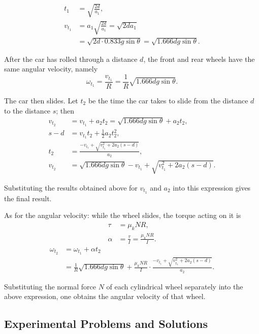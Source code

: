 \begin{align*}
t_1 &= \sqrt{\frac{2d}{a_1}},\\
v_{t_1} &= a_1\sqrt{\frac{2d}{a_1}} = \sqrt{2da_1}\\
&= \sqrt{2d\cdot 0.833g\sin\theta} = \sqrt{1.666dg\sin\theta}. \tag{28}
\end{align*}

After the car has rolled through a distance $d$, the front and rear wheels have the same angular velocity, namely
\begin{equation}
\omega_{t_1} = \frac{v_{t_1}}{R} = \frac{1}{R}\sqrt{1.666dg\sin\theta}. \tag{29}
\end{equation}

The car then slides. Let $t_2$ be the time the car takes to slide from the distance $d$ to the distance $s$; then
\begin{align*}
v_{t_2} &= v_{t_1} + a_2t_2 = \sqrt{1.666dg\sin\theta} + a_2t_2,\\
s - d &= v_{t_1}t_2 + \frac{1}{2}a_2t_2^2,\\
t_2 &= \frac{-v_{t_1} + \sqrt{v_{t_1}^2 + 2a_2(s-d)}}{a_2},\\
v_{t_2} &= \sqrt{1.666dg\sin\theta} - v_{t_1} + \sqrt{v_{t_1}^2 + 2a_2(s-d)}. \tag{30}
\end{align*}

Substituting the results obtained above for $v_{t_1}$ and $a_2$ into this expression gives the final result.

As for the angular velocity: while the wheel slides, the torque acting on it is
\begin{align*}
\tau &= \mu_k NR,\\
\alpha &= \frac{\tau}{I} = \frac{\mu_k NR}{I}. \tag{31}
\end{align*}
\begin{align*}
\omega_{t_2} &= \omega_{t_1} + \alpha t_2\\
&= \frac{1}{R}\sqrt{1.666dg\sin\theta}
+ \frac{\mu_k NR}{I}\cdot\frac{-v_{t_1} + \sqrt{v_{t_1}^2 + 2a_2(s-d)}}{a_2}.
\end{align*}

Substituting the normal force $N$ of each cylindrical wheel separately into the above expression, one obtains the angular velocity of that wheel.

\subsection*{Experimental Problems and Solutions}

